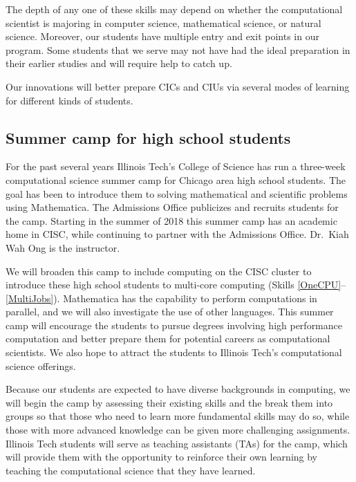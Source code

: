 \documentclass[11pt]{NSFamsart}
\begin{document}
The depth of any one of these skills may depend on whether the computational scientist is majoring in computer science, mathematical science, or natural science.  Moreover, our students have multiple entry and exit points in our program.  Some students that we serve may not have had the ideal preparation in their earlier studies and will require help to catch up.


Our innovations will better prepare CICs and CIUs via several modes of learning for different kinds of students.

\subsection{Summer camp for high school students} \label{Camp} For the past several years Illinois Tech's College of Science has run a three-week computational science summer camp for Chicago area high school students.  The goal has been to introduce them to solving mathematical and scientific problems using Mathematica.  The Admissions Office publicizes and recruits students for the camp.  Starting in the summer of 2018 this summer camp has an academic home in CISC, while continuing to partner with the Admissions Office.  Dr.\ Kiah Wah Ong is the instructor.

We will broaden this camp to include computing on the CISC cluster to introduce these high school students to multi-core computing (Skills \ref{OneCPU}--\ref{MultiJobs}).  Mathematica has the capability to perform computations in parallel, and we will also investigate the use of other languages.  This summer camp will encourage the students to pursue degrees involving high performance computation and better prepare them for potential careers as computational scientists.  We also hope to attract the students to Illinois Tech's computational science offerings.  

Because our students are expected to have diverse backgrounds in computing, we will begin the camp by assessing their existing skills and the break them into groups so that those who need to learn more fundamental skills may do so, while those with more advanced knowledge can be given more challenging assignments.  Illinois Tech students will serve as teaching assistants (TAs) for the camp, which will provide them with the opportunity to reinforce their own learning by teaching the computational science that they have learned. 
\end{document}
